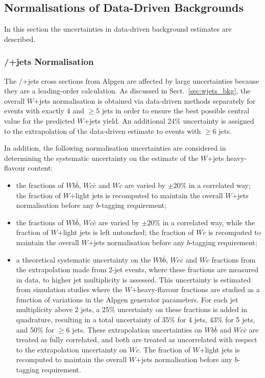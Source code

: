 \subsection{Normalisations of Data-Driven Backgrounds}
\label{sec:syst_normHTX}
In this section the uncertainties in data-driven background estimates are described.

\subsubsection{\Wboson/\Zboson+jets Normalisation}
\label{sec:syst_vjetsnormHTX}
The \Wboson/\Zboson+jets cross sections from {\sc Alpgen} are affected by large uncertainties because they 
are a leading-order calculation. 
As discussed in Sect.~\ref{sec:wjets_bkg}, the overall $W$+jets normalisation is obtained via data-driven methods 
separately for events with exactly 4 and $\geq 5$ jets in order to ensure the best possible central value for the 
predicted $W$+jets yield. An additional 24\% uncertainty is assigned to the extrapolation of the data-driven
estimate to events with $\geq 6$ jets.

In addition, the following normalisation uncertainties are considered in
determining the systematic uncertainty on the estimate of the $W$+jets
heavy-flavour content:
\begin{itemize}
\item the fractions of $Wb\bar{b}$, $Wc\bar{c}$ and $Wc$ are varied by $\pm 20\%$ 
in a correlated way; the fraction of $W$+light jets is recomputed to
maintain the overall  $W$+jets normalisation before any $b$-tagging requirement;
\item  the fractions of $Wb\bar{b}$, $Wc\bar{c}$ are varied by $\pm 20\%$ 
in a correlated way, while the fraction of $W$+light jets is left untouched; the
fraction of $Wc$ is recomputed to maintain the overall  $W$+jets normalisation before any $b$-tagging requirement;
\item a theoretical systematic uncertainty on the $Wb\bar{b}$, $Wc\bar{c}$  and $Wc$ fractions
from the extrapolation made from 2-jet events, where these fractions are measured in data, 
to higher jet multiplicity is assessed. This uncertainty is estimated from simulation studies where
the $W$+heavy-flavour fractions are studied as a function of variations in the {\sc Alpgen} generator parameters.
For each jet multiplicity above 2 jets, a 25\% uncertainty
on these fractions is added in quadrature, resulting in a total uncertainty of 35\% for 4 jets, 43\% for 5 jets,
and 50\% for $\geq 6$ jets. 
These extrapolation uncertainties on $Wb\bar{b}$ and $Wc\bar{c}$ are
treated as fully correlated, and both are treated as uncorrelated with respect to
the extrapolation uncertainty on $Wc$.
The fraction of $W$+light jets is recomputed to
maintain the overall  $W$+jets normalisation  before any $b$-tagging requirement.
\end{itemize}

